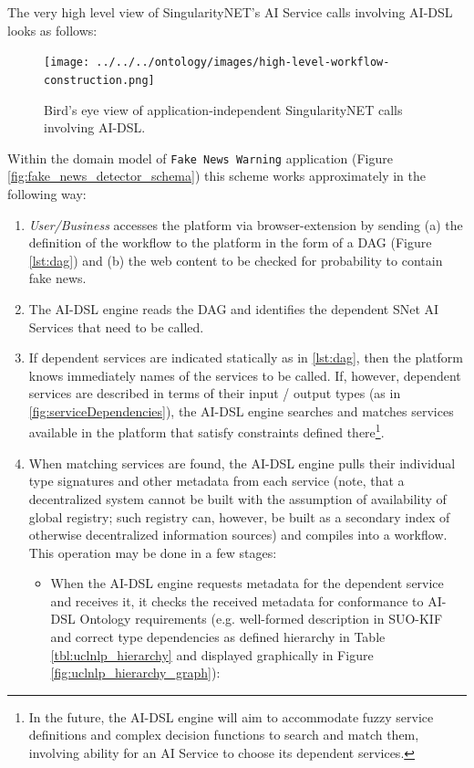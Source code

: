 \documentclass[]{report}
\begin{document}
The very high level view of SingularityNET's
AI Service calls involving AI-DSL looks as follows:

\begin{figure}[H]
	\centering
	\texttt{[image: ../../../ontology/images/high-level-workflow-construction.png]}
	\captionsetup{width=0.9\linewidth}
	\caption{\label{fig:high-level-workflow-construction}Bird's eye view of 
		application-independent SingularityNET calls involving AI-DSL.}
\end{figure}

Within the domain model of \texttt{Fake News Warning} application (Figure 
\ref{fig:fake_news_detector_schema}) this scheme works approximately in the following
way:
\begin{enumerate}
\item \textit{User/Business} accesses the platform 
via browser-extension by sending (a) the definition of the workflow to the
platform in the form of a DAG (Figure \ref{lst:dag}) and 
(b) the web content to be checked for probability to contain fake news.
\item The AI-DSL engine reads the DAG and identifies the dependent SNet AI Services that
need to be called.
\item If dependent services are indicated statically as in \ref{lst:dag},
then the platform knows immediately names of the services to be called. If, however,
dependent services are described in terms of their input / output types (as in
\ref{fig:serviceDependencies}), the AI-DSL engine searches and matches services available
in the platform that satisfy constraints defined there\footnote{In the
future, the AI-DSL engine
will aim to accommodate fuzzy service definitions and complex decision functions to
search and match them, involving ability for an AI Service to choose its
dependent services.}.
\item When matching services are found, the AI-DSL engine pulls their individual type
signatures and other metadata from each service (note, that a decentralized system
cannot be built with the assumption of availability of global registry; such registry
can, however, be built as a secondary index of otherwise decentralized information
sources) and compiles into a workflow. This operation may be done in a few stages:
\begin{itemize}
	\item When the AI-DSL engine requests metadata for the dependent service and receives it,
	it checks the received metadata for conformance to AI-DSL Ontology requirements
	(e.g. well-formed description in SUO-KIF and correct type dependencies as defined
	hierarchy in Table \ref{tbl:uclnlp_hierarchy} and displayed graphically in
	Figure \ref{fig:uclnlp_hierarchy_graph}):
	

\end{itemize}
\end{enumerate}
\end{document}
